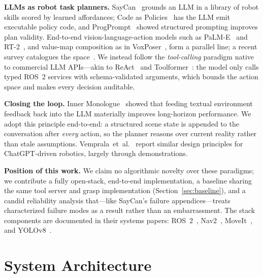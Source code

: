 \documentclass[conference]{IEEEtran}
\begin{document}
\textbf{LLMs as robot task planners.} SayCan~\cite{saycan} grounds an LLM
in a library of robot skills scored by learned affordances; Code as
Policies~\cite{codeaspolicies} has the LLM emit executable policy code, and
ProgPrompt~\cite{progprompt} showed structured prompting improves plan
validity. End-to-end vision-language-action models such as
PaLM-E~\cite{palme} and RT-2~\cite{rt2}, and value-map composition as in
VoxPoser~\cite{voxposer}, form a parallel line; a recent survey catalogues
the space~\cite{llmrobosurvey}. We instead follow the \emph{tool-calling}
paradigm native to commercial LLM APIs---akin to ReAct~\cite{react} and
Toolformer~\cite{toolformer}: the model only calls typed ROS~2 services
with schema-validated arguments, which bounds the action space and makes
every decision auditable.

\textbf{Closing the loop.} Inner Monologue~\cite{innermonologue} showed
that feeding textual environment feedback back into the LLM materially
improves long-horizon performance. We adopt this principle end-to-end: a
structured scene state is appended to the conversation after \emph{every}
action, so the planner reasons over current reality rather than stale
assumptions. Vemprala~et~al.~\cite{chatgptrobotics} report similar design
principles for ChatGPT-driven robotics, largely through demonstrations.

\textbf{Position of this work.} We claim no algorithmic novelty over these
paradigms; we contribute a fully open-stack, end-to-end implementation, a
baseline sharing the same tool server and grasp implementation
(Section~\ref{sec:baseline}), and a candid reliability analysis
that---like SayCan's failure appendices---treats characterized failure
modes as a result rather than an embarrassment. The stack components are
documented in their systems papers: ROS~2~\cite{ros2}, Nav2~\cite{nav2},
MoveIt~\cite{moveit}, and YOLOv8~\cite{yolov8}.

\section{System Architecture}
\label{sec:architecture}
\end{document}
